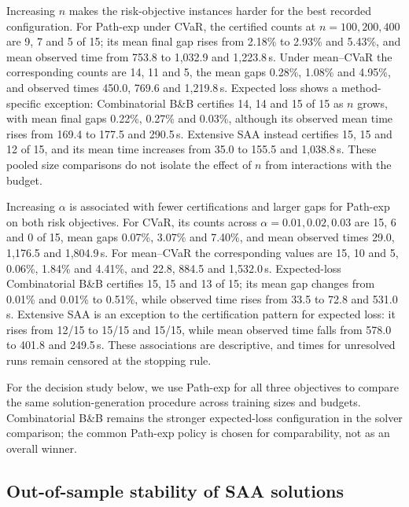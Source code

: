 Increasing $n$ makes the risk-objective instances harder for the best
recorded configuration. For Path-exp under CVaR, the certified counts
at $n=100,200,400$ are 9, 7 and 5 of 15; its mean final gap rises
from 2.18\% to 2.93\% and 5.43\%, and mean observed time from
753.8 to 1,032.9 and 1,223.8\,s. Under mean--CVaR the corresponding
counts are 14, 11 and 5, the mean gaps 0.28\%, 1.08\% and 4.95\%,
and observed times 450.0, 769.6 and 1,219.8\,s. Expected loss
shows a method-specific exception: Combinatorial B\&B certifies
14, 14 and 15 of 15 as $n$ grows, with mean final gaps 0.22\%,
0.27\% and 0.03\%, although its observed mean time rises from
169.4 to 177.5 and 290.5\,s. Extensive SAA instead certifies
15, 15 and 12 of 15, and its mean time increases from 35.0 to
155.5 and 1,038.8\,s. These pooled size comparisons do not isolate
the effect of $n$ from interactions with the budget.

Increasing $\alpha$ is associated with fewer certifications and larger
gaps for Path-exp on both risk objectives. For CVaR, its counts across
$\alpha=0.01,0.02,0.03$ are 15, 6 and 0 of 15, mean gaps 0.07\%,
3.07\% and 7.40\%, and mean observed times 29.0, 1,176.5 and
1,804.9\,s. For mean--CVaR the corresponding values are 15, 10
and 5, 0.06\%, 1.84\% and 4.41\%, and 22.8, 884.5 and
1,532.0\,s. Expected-loss Combinatorial B\&B certifies 15, 15
and 13 of 15; its mean gap changes from 0.01\% and 0.01\% to
0.51\%, while observed time rises from 33.5 to 72.8 and
531.0\,s. Extensive SAA is an exception to the certification
pattern for expected loss: it rises from 12/15 to 15/15 and 15/15,
while mean observed time falls from 578.0 to 401.8 and 249.5\,s.
These associations are descriptive, and times for unresolved runs
remain censored at the stopping rule.

For the decision study below, we use Path-exp for all three objectives
to compare the same solution-generation procedure across training
sizes and budgets. Combinatorial B\&B remains the stronger
expected-loss configuration in the solver comparison; the common
Path-exp policy is chosen for comparability, not as an overall winner.

\FloatBarrier
\subsection{Out-of-sample stability of SAA solutions}\label{sec:oos-stability}

